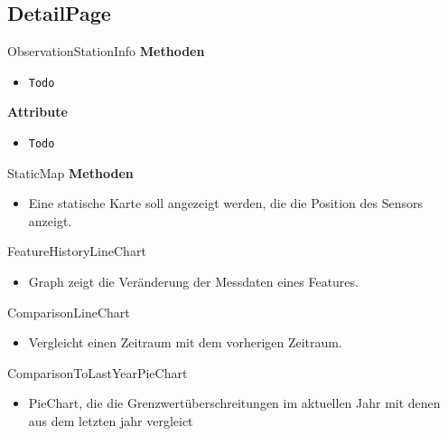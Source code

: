 \subsection{DetailPage}

   
    \begin{Class}{ObservationStationInfo}
        \textbf{Methoden}
        \begin{itemize}
            \item \texttt{Todo}
        \end{itemize}
        
        \textbf{Attribute}
        \begin{itemize}
            \item \texttt{Todo}
        \end{itemize}
    \end{Class}

    \begin{Class}{StaticMap}
        \textbf{Methoden}
        \begin{itemize}
            \item Eine statische Karte soll angezeigt werden, die die Position des Sensors anzeigt.
        \end{itemize}
    \end{Class}

  
    \begin{Class}{FeatureHistoryLineChart}
        \begin{itemize}
            \item Graph zeigt die Veränderung der Messdaten eines Features.
        \end{itemize}
        

    \end{Class}

    \begin{Class}{ComparisonLineChart}
        \begin{itemize}
            \item Vergleicht einen Zeitraum mit dem vorherigen Zeitraum.
        \end{itemize}
    \end{Class}

    \begin{Class}{ComparisonToLastYearPieChart}
        \begin{itemize}
            \item PieChart, die die Grenzwertüberschreitungen im aktuellen Jahr mit denen aus dem letzten jahr vergleict 
        \end{itemize}
    \end{Class}

